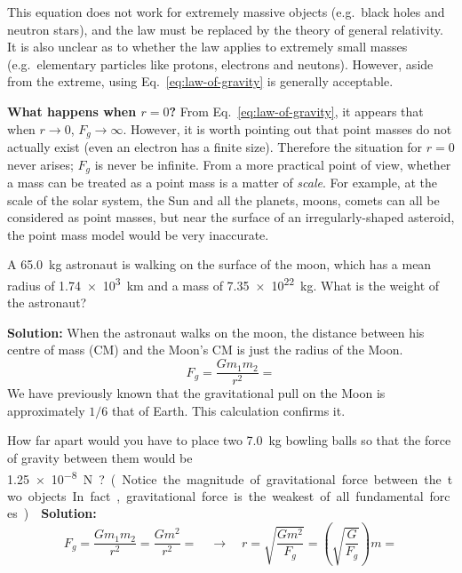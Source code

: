 This equation does not work for extremely massive objects (e.g.\ black holes
and neutron stars), and the law must be replaced by the theory of general
relativity. It is also unclear as to whether the law applies to
extremely small masses (e.g.\ elementary particles like protons, electrons and
neutons). However, aside from the extreme, using Eq.~\ref{eq:law-of-gravity} is
generally acceptable.
\begin{common-question}
  \textbf{What happens when $r=0$?} From Eq.~\ref{eq:law-of-gravity}, it
  appears that when $r\rightarrow 0$, $F_g\rightarrow\infty$. However, it is
  worth pointing out that point masses do not actually exist (even an electron
  has a finite size). Therefore the situation for $r=0$ never arises; $F_g$ is
  never be infinite. From a more practical point of view, whether a mass can be
  treated as a point mass is a matter of \emph{scale}. For example, at the
  scale of the solar system, the Sun and all the planets, moons, comets can all
  be considered as point masses, but near the surface of an
  irregularly-shaped asteroid, the point mass model would be very inaccurate.
\end{common-question}




\begin{example}
  A \SI{65.0}{\kilo\gram} astronaut is walking on the surface of the moon,
  which has a mean radius of \SI{1.74e3}{\kilo\metre} and a mass of
  \SI{7.35e22}{\kilo\gram}. What is the weight of the astronaut?

  \textbf{Solution:} When the astronaut walks on the moon, the
  distance between his centre of mass (CM) and the Moon's CM is just the
  radius of the Moon.
  \begin{equation*}
    F_g=\frac{Gm_1m_2}{r^2}=
  \end{equation*}
  We have previously known that the gravitational pull on the Moon is
  approximately $1/6$ that of Earth. This calculation confirms it.
\end{example}



\begin{example}
  How far apart would you have to place two
  \SI{7.0}{\kilo\gram} bowling balls so that the force of gravity between them
  would be \SI{1.25e-8}\newton? (Notice the magnitude of gravitational force
  between the two objects. In fact, gravitational force is the weakest of all
  fundamental forces.)

  \vspace{.15in}\textbf{Solution:}
  \begin{equation*}
    F_g=\frac{Gm_1m_2}{r^2}=\frac{Gm^2}{r^2}=\quad\rightarrow\quad
    r=\sqrt{\frac{Gm^2}{F_g}}=\left(\sqrt{\frac G{F_g}}\right)m=
  \end{equation*}
\end{example}



